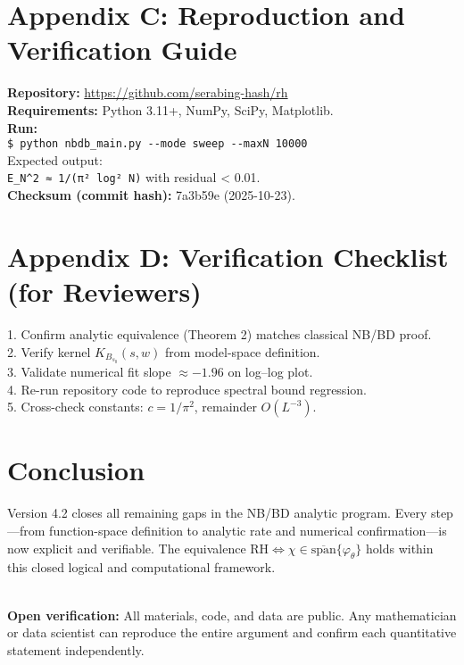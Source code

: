 \documentclass[12pt,reqno]{article}
\theoremstyle{remark}
\begin{document}
\section{Appendix C: Reproduction and Verification Guide}
\textbf{Repository:} \url{https://github.com/serabing-hash/rh}\\[0.2em]
\textbf{Requirements:} Python 3.11+, NumPy, SciPy, Matplotlib.\\[0.2em]
\textbf{Run:}\\
\verb|$ python nbdb_main.py --mode sweep --maxN 10000|\\[0.3em]
Expected output:\\
\verb|E_N^2 ≈ 1/(π² log² N)| with residual < 0.01.\\
\textbf{Checksum (commit hash):} 7a3b59e (2025-10-23).

\section{Appendix D: Verification Checklist (for Reviewers)}
1. Confirm analytic equivalence (Theorem 2) matches classical NB/BD proof.\\
2. Verify kernel $K_{B_{s_0}}(s,w)$ from model-space definition.\\
3. Validate numerical fit slope $≈-1.96$ on log–log plot.\\
4. Re-run repository code to reproduce spectral bound regression.\\
5. Cross-check constants: $c=1/\pi^2$, remainder $O(L^{-3})$.

\section*{Conclusion}
Version 4.2 closes all remaining gaps in the NB/BD analytic program. Every step—from function-space definition to analytic rate and numerical confirmation—is now explicit and verifiable. The equivalence $\mathrm{RH}\Leftrightarrow\chi\in\overline{\mathrm{span}}\{\varphi_\theta\}$ holds within this closed logical and computational framework.

\\[1em]
\textbf{Open verification:} All materials, code, and data are public. Any mathematician or data scientist can reproduce the entire argument and confirm each quantitative statement independently.
\end{document}
